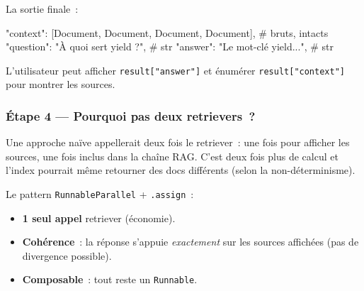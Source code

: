\documentclass[11pt,a4paper]{article}
\begin{document}
La sortie finale~:

\begin{pythoncode}
{
    "context":  [Document, Document, Document, Document],  # bruts, intacts
    "question": "À quoi sert yield ?",                      # str
    "answer":   "Le mot-clé yield...",                      # str
}
\end{pythoncode}

L'utilisateur peut afficher \texttt{result["answer"]} et énumérer
\texttt{result["context"]} pour montrer les sources.

\subsubsection*{Étape 4 — Pourquoi pas deux retrievers~?}

Une approche naïve appellerait deux fois le retriever~: une fois pour
afficher les sources, une fois inclus dans la chaîne RAG. C'est deux
fois plus de calcul et l'index pourrait même retourner des docs
différents (selon la non-déterminisme).

Le pattern \texttt{RunnableParallel} + \texttt{.assign}~:
\begin{itemize}[leftmargin=*]
  \item \textbf{1 seul appel} retriever (économie).
  \item \textbf{Cohérence}~: la réponse s'appuie \emph{exactement} sur
        les sources affichées (pas de divergence possible).
  \item \textbf{Composable}~: tout reste un \texttt{Runnable}.
\end{itemize}
\end{document}
